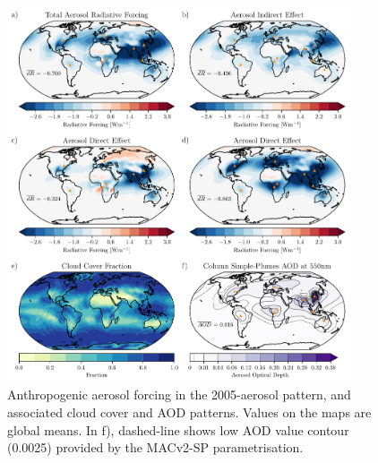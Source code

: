 \documentclass[draft]{agujournal2019}
\begin{document}
      \begin{figure}
            \centering
            \includegraphics[width=0.9\textwidth]{../../figures/figure3}
            \caption{Anthropogenic aerosol forcing in the 2005-aerosol pattern, and associated cloud cover and AOD patterns. Values on the maps are global means. In f), dashed-line shows low AOD value contour (0.0025) provided by the MACv2-SP parametrisation.}
            \label{fig:figure3}
      \end{figure}
\end{document}
